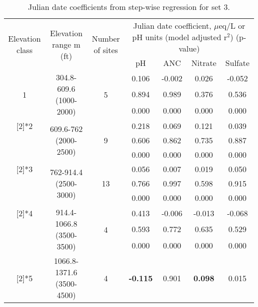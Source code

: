 \begin{table}[htbp]
  \centering
  \caption{Julian date coefficients from step-wise regression for set 3.}
    \begin{tabular}{ccccccc}
    \toprule
    \multirow{3}[4]{2cm}{Elevation class} & \multirow{3}[4]{2.5cm}{Elevation range m (ft)} & \multirow{3}[4]{2cm}{Number of sites} & \multicolumn{4}{c}{\multirow{2}[2]{7cm}{Julian date coefficient, $\mu$eq/L or pH units (model adjusted r$^2$) (p-value)}} \\
          &       &       & \multicolumn{4}{c}{} \bigstrut\\\cline{4-7}\noalign{\smallskip}
          &       &       & pH    & ANC   & Nitrate & Sulfate \\
\midrule
    \multirow{3}[2]{*}{1} & \multirow{3}[2]{2.5cm}{304.8-609.6 (1000-2000)} & \multirow{3}[2]{*}{5} & 0.106  & -0.002  & 0.026  & -0.052  \\
          &       &       & 0.894  & 0.989  & 0.376  & 0.536  \\
          &       &       & 0.000  & 0.000  & 0.000  & 0.000 \bigstrut\\\cline{4-7}\noalign{\smallskip}
    \multirow{3}[2]{*}{2} & \multirow{3}[2]{2.5cm}{609.6-762 (2000-2500)} & \multirow{3}[2]{*}{9} & 0.218  & 0.069  & 0.121  & 0.039  \\
          &       &       & 0.606  & 0.862  & 0.735  & 0.887  \\
          &       &       & 0.000  & 0.000  & 0.000  & 0.000 \bigstrut\\\cline{4-7}\noalign{\smallskip}
    \multirow{3}[2]{*}{3} & \multirow{3}[2]{2.5cm}{762-914.4 (2500-3000)} & \multirow{3}[2]{*}{13} & 0.056  & 0.007  & 0.019  & 0.050  \\
          &       &       & 0.766  & 0.997  & 0.598  & 0.915  \\
          &       &       & 0.000  & 0.000  & 0.000  & 0.000  \bigstrut\\\cline{4-7}\noalign{\smallskip}
    \multirow{3}[2]{*}{4} & \multirow{3}[2]{2.5cm}{914.4-1066.8 (3500-3500)} & \multirow{3}[2]{*}{4} & 0.413  & -0.006  & -0.013  & -0.068  \\
          &       &       & 0.593  & 0.772  & 0.635  & 0.529  \\
          &       &       & 0.000  & 0.000  & 0.000  & 0.000  \bigstrut\\\cline{4-7}\noalign{\smallskip}
    \multirow{3}[2]{*}{5} & \multirow{3}[2]{2.5cm}{1066.8-1371.6 (3500-4500)} & \multirow{3}[2]{*}{4} & \textbf{-0.115 } & 0.901  & \textbf{0.098 } & 0.015  \\

\end{tabular}
\end{table}
